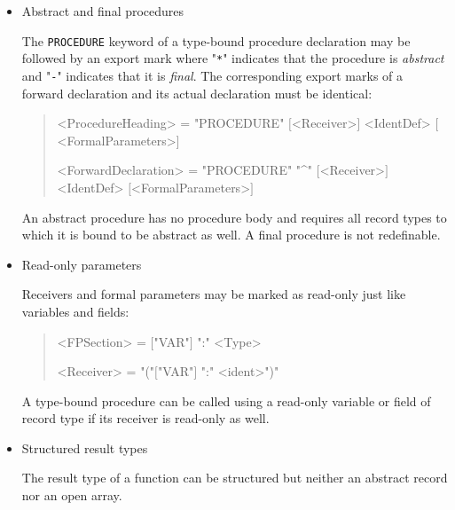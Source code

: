 
\begin{itemize}

\item Abstract and final procedures

The \texttt{PROCEDURE} keyword of a type-bound procedure declaration may be followed by an export mark where "\texttt{*}" indicates that the procedure is \emph{abstract} and "\texttt{-}" indicates that it is \emph{final}.
The corresponding export marks of a forward declaration and its actual declaration must be identical:

\begin{quote}\begin{grammar}
<ProcedureHeading> = "PROCEDURE" \changed{$[$"*"$\mid$"-"$]$} $[$<Receiver>$]$ <IdentDef> $[$<FormalParameters>$]$ \par
<ForwardDeclaration> = "PROCEDURE" \changed{$[$"*"$\mid$"-"$]$} "^" $[$<Receiver>$]$ <IdentDef> $[$<FormalParameters>$]$ \par
\end{grammar}\end{quote}

An abstract procedure has no procedure body and requires all record types to which it is bound to be abstract as well.
A final procedure is not redefinable.

\item Read-only parameters

Receivers and formal parameters may be marked as read-only just like variables and fields:

\begin{quote}\begin{grammar}
<FPSection> = $[$"VAR"$]$ ":" <Type> \par
<Receiver> = "("$[$"VAR"$]$ ":" <ident>")" \par
\end{grammar}\end{quote}

A type-bound procedure can be called using a read-only variable or field of record type if its receiver is read-only as well.

\item Structured result types

The result type of a function can be structured but neither an abstract record nor an open array.

\end{itemize}

